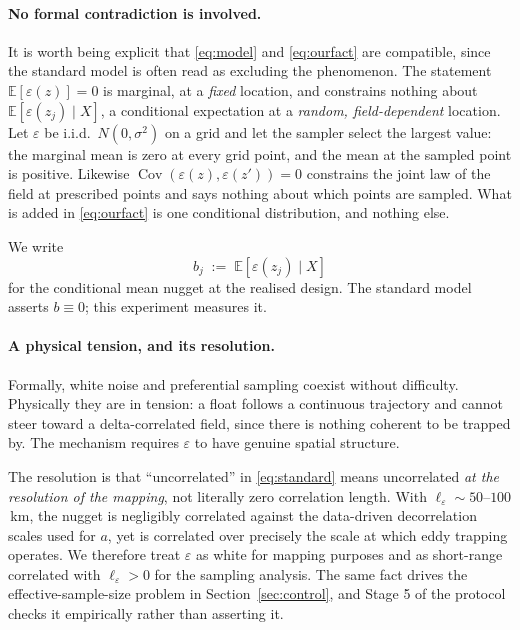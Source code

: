 \documentclass[11pt]{article}
\begin{document}
\paragraph{No formal contradiction is involved.} It is worth being explicit that
\eqref{eq:model} and \eqref{eq:ourfact} are compatible, since the standard model is often read
as excluding the phenomenon. The statement $\mathbb{E}[\varepsilon(z)] = 0$ is marginal, at a
\emph{fixed} location, and constrains nothing about
$\mathbb{E}[\varepsilon(z_j) \mid X]$, a conditional expectation at a \emph{random,
field-dependent} location. Let $\varepsilon$ be i.i.d.\ $N(0,\sigma^2)$ on a grid and let the
sampler select the largest value: the marginal mean is zero at every grid point, and the mean at
the sampled point is positive. Likewise
$\operatorname{Cov}(\varepsilon(z),\varepsilon(z')) = 0$ constrains the joint law of the field
at prescribed points and says nothing about which points are sampled. What is added in
\eqref{eq:ourfact} is one conditional distribution, and nothing else.

We write
\begin{equation}
  \label{eq:b}
  b_j \;:=\; \mathbb{E}\!\left[\varepsilon(z_j) \mid X\right]
\end{equation}
for the conditional mean nugget at the realised design. The standard model asserts
$b \equiv 0$; this experiment measures it.

\paragraph{A physical tension, and its resolution.} Formally, white noise and preferential
sampling coexist without difficulty. Physically they are in tension: a float follows a
continuous trajectory and cannot steer toward a delta-correlated field, since there is nothing
coherent to be trapped by. The mechanism requires $\varepsilon$ to have genuine spatial
structure.

The resolution is that ``uncorrelated'' in \eqref{eq:standard} means uncorrelated \emph{at the
resolution of the mapping}, not literally zero correlation length. With
$\ell_\varepsilon \sim 50$--$100$\,km, the nugget is negligibly correlated against the
data-driven decorrelation scales used for $a$, yet is correlated over precisely the scale at
which eddy trapping operates. We therefore treat $\varepsilon$ as white for mapping purposes
and as short-range correlated with $\ell_\varepsilon > 0$ for the sampling analysis. The same
fact drives the effective-sample-size problem in Section~\ref{sec:control}, and Stage 5 of the
protocol checks it empirically rather than asserting it.
\end{document}

